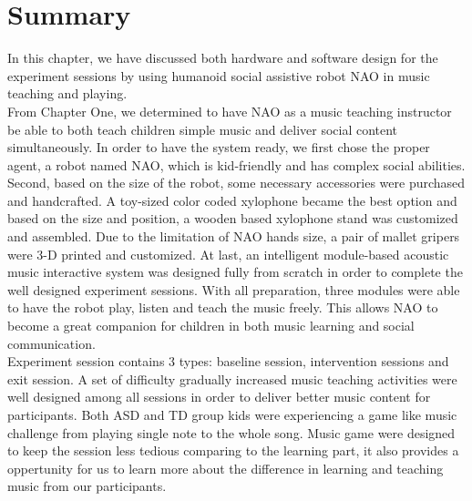 \section{Summary}
In this chapter, we have discussed both hardware and software design for the experiment sessions
by using humanoid social assistive robot NAO in music teaching and playing.\\

From Chapter One, we determined to have NAO as a music teaching instructor be able
to both teach children simple music and deliver social content simultaneously.
In order to have the system ready, we first chose the proper agent, a robot named NAO, which is
kid-friendly and has complex social abilities. Second, based on the size of the robot, some necessary
accessories were purchased and handcrafted. A toy-sized color coded xylophone became the
best option and based on the size and position, a wooden based xylophone stand was 
customized and assembled. Due to the limitation of NAO hands size, a pair of mallet gripers 
were 3-D printed and customized. At last, an intelligent module-based acoustic music 
interactive system was designed fully from scratch in order to complete the well designed experiment 
sessions. With all preparation, three modules were able to have the robot 
play, listen and teach the music freely. This allows NAO to become a great companion for 
children in both music learning and social communication. \\

Experiment session contains 3 types: baseline session, intervention sessions and exit session.
A set of difficulty gradually increased music teaching activities were well designed among all sessions
in order to deliver better music content for participants. Both ASD and TD group kids were
experiencing a game like music challenge from playing single note to the whole song. Music
game were designed to keep the session less tedious comparing to the learning part, it also
provides a oppertunity for us to learn more about the difference in learning and teaching 
music from our participants.\\


